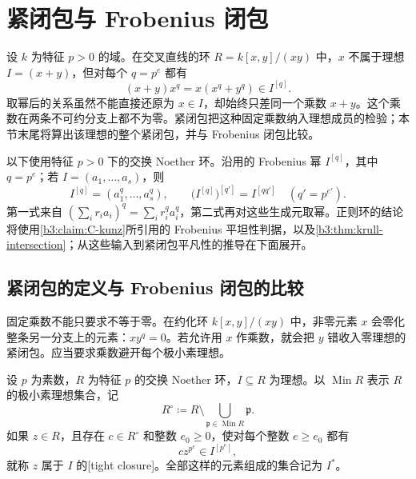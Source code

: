
\section{紧闭包与 Frobenius 闭包}
\label{b3:sec:C05}

设 \(k\) 为特征 \(p>0\) 的域。在交叉直线的环 \(R=k[x,y]/(xy)\) 中，\(x\) 不属于理想 \(I=(x+y)\)，但对每个 \(q=p^e\) 都有
\[
	(x+y)x^q=x(x^q+y^q)\in I^{[q]}.
\]
取幂后的关系虽然不能直接还原为 \(x\in I\)，却始终只差同一个乘数 \(x+y\)。这个乘数在两条不可约分支上都不为零。紧闭包把这种固定乘数纳入理想成员的检验；本节末尾将算出该理想的整个紧闭包，并与 Frobenius 闭包比较。

\ProseParagraphBreak
以下使用特征 \(p>0\) 下的交换 Noether 环。沿用的 Frobenius 幂 \(I^{[q]}\)，其中 \(q=p^e\)；若 \(I=(a_1,\ldots,a_s)\)，则
\[
	I^{[q]}=(a_1^q,\ldots,a_s^q),\qquad
	\bigl(I^{[q]}\bigr)^{[q']}=I^{[qq']}
	\quad(q'=p^{e'}).
\]
第一式来自 \((\sum_i r_i a_i)^q=\sum_i r_i^q a_i^q\)，第二式再对这些生成元取幂。正则环的结论将使用\cref{b3:claim:C-kunz}所引用的 Frobenius 平坦性判据，以及\cref{b3:thm:krull-intersection}；从这些输入到紧闭包平凡性的推导在下面展开。

\subsection{紧闭包的定义与 Frobenius 闭包的比较}
\label{b3:subsec:C05:01}

固定乘数不能只要求不等于零。在约化环 \(k[x,y]/(xy)\) 中，非零元素 \(x\) 会零化整条另一分支上的元素：\(xy^q=0\)。若允许用 \(x\) 作乘数，就会把 \(y\) 错收入零理想的紧闭包。应当要求乘数避开每个极小素理想。

\begin{definition}\label{b3:def:C-tight-closure}
	设 \(p\) 为素数，\(R\) 为特征 \(p\) 的交换 Noether 环，\(I\subseteq R\) 为理想。以 \(\operatorname{Min}R\) 表示 \(R\) 的极小素理想集合，记
	\[
		R^\circ\coloneqq R\setminus
		\bigcup_{\mathfrak p\in\operatorname{Min}R}\mathfrak p.
	\]
	如果 \(z\in R\)，且存在 \(c\in R^\circ\) 和整数 \(e_0\ge0\)，使对每个整数 \(e\ge e_0\) 都有
	\[
		c z^{p^e}\in I^{[p^e]},
	\]
	就称 \(z\) 属于 \(I\) 的[tight closure]。全部这样的元素组成的集合记为 \(I^*\)。
\end{definition}

